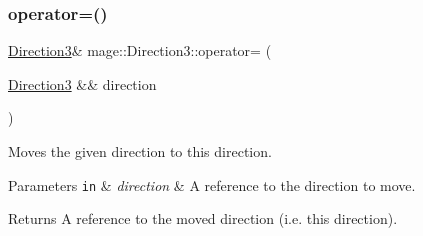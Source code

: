 \subsubsection{\texorpdfstring{operator=()}{operator=()}\hspace{0.1cm}{\footnotesize\ttfamily [2/2]}}
{\footnotesize\ttfamily \hyperlink{structmage_1_1_direction3}{Direction3}\& mage\+::\+Direction3\+::operator= (\begin{DoxyParamCaption}\item[{\hyperlink{structmage_1_1_direction3}{Direction3} \&\&}]{direction }\end{DoxyParamCaption})\hspace{0.3cm}{\ttfamily [default]}}

Moves the given direction to this direction.


\begin{DoxyParams}[1]{Parameters}
\mbox{\tt in}  & {\em direction} & A reference to the direction to move. \\
\hline
\end{DoxyParams}
\begin{DoxyReturn}{Returns}
A reference to the moved direction (i.\+e. this direction). 
\end{DoxyReturn}

